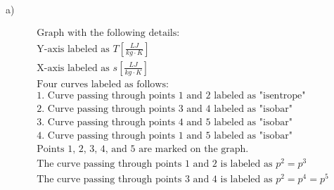 a)

\[
\begin{array}{c}
\text{Graph with the following details:} \\
\text{Y-axis labeled as } T \left[ \frac{LJ}{kg \cdot K} \right] \\
\text{X-axis labeled as } s \left[ \frac{LJ}{kg \cdot K} \right] \\
\text{Four curves labeled as follows:} \\
\text{1. Curve passing through points 1 and 2 labeled as "isentrope"} \\
\text{2. Curve passing through points 3 and 4 labeled as "isobar"} \\
\text{3. Curve passing through points 4 and 5 labeled as "isobar"} \\
\text{4. Curve passing through points 1 and 5 labeled as "isobar"} \\
\text{Points 1, 2, 3, 4, and 5 are marked on the graph.} \\
\text{The curve passing through points 1 and 2 is labeled as } p^2 = p^3 \\
\text{The curve passing through points 3 and 4 is labeled as } p^2 = p^4 = p^5 \\
\end{array}
\]